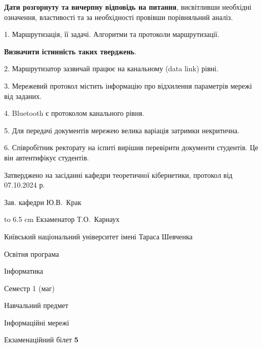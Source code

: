 \documentclass[12pt, ukrainian]{article}
\begin{document}
{
\qquad\textbf{Дати розгорнуту та вичерпну відповідь на питання}, висвітливши необхідні означення, властивості та за необхідності провівши порівняльний аналіз.

1. Маршрутизація, її задачі. Алгоритми та протоколи маршрутизації.



\qquad\textbf{Визначити істинність таких тверджень}.

2. Маршрутизатор зазвичай працює на канальному (data link) рівні.


3. Мережевий протокол містить інформацію про відхилення параметрів мережі від заданих.


4. Bluetooth є протоколом канального рівня.


5. Для передачі документів мережею велика варіація затримки некритична.


6. Співробітник ректорату на іспиті вирішив перевірити документи студентів. Це він автентифікує студентів.

}
{\smallskip\smallskip \begin {scriptsize} Затверджено на засіданні кафедри теоретичної кібернетики, протокол   від   07.10.2024 р.\par\smallskip\smallskip\smallskip\smallskip
{\parbox {6.5 cm} {Зав. кафедри \dotfill Ю.В.~Крак}}\hspace {0.7cm} {\hbox to 6.5 cm { Екзаменатор \dotfill Т.О.~Карнаух}} \end{scriptsize}}
\vspace{0.9cm}
{{\begin {scriptsize}\par
{ \center  Київський національний університет імені Тараса Шевченка \par}
{\parbox {5 cm}{Освітня програма \hfill}{\parbox {7 cm}{Інформатика\hfill}}\parbox {6 cm}{\hfill Семестр 1 (маг)}}\par
{\parbox {5 cm} {Навчальний предмет \hfill}\parbox {7 cm}{Інформаційні мережі \hfill}\parbox {6cm}{\hfill}\par}\vspace{-15pt} \end{scriptsize}}{\center Екзаменаційний білет \No \textbf { 5 }\par}}
\end{document}
